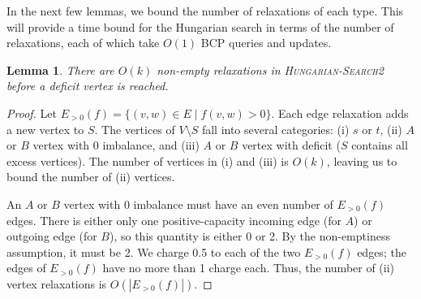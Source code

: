 \documentclass[11pt]{article}
\def\eps{\varepsilon}
\theoremstyle{plain}
\newtheorem{lemma}{Lemma}
\begin{document}








In the next few lemmas, we bound the number of relaxations of each type.
This will provide a time bound for the Hungarian search in terms of the
number of relaxations, each of which take $O(1)$ BCP queries and updates.

\begin{lemma}
\label{lemma:goldberg_hs_length1}
There are $O(k)$ non-empty relaxations in \textsc{Hungarian-Search2} before a
deficit vertex is reached.
\end{lemma}

\begin{proof}
Let $E_{>0}(f) = \{(v, w) \in E \mid f(v, w) > 0\}$.
Each edge relaxation adds a new vertex to $S$.
The vertices of $V \setminus S$ fall into several categories:
(i) $s$ or $t$, (ii) $A$ or $B$ vertex with 0 imbalance, and (iii) $A$ or $B$
vertex with deficit ($S$ contains all excess vertices).
The number of vertices in (i) and (iii) is $O(k)$, leaving us to bound the
number of (ii) vertices.

An $A$ or $B$ vertex with 0 imbalance must have an even number of $E_{>0}(f)$
edges.
There is either only one positive-capacity incoming edge (for $A$) or outgoing
edge (for $B$), so this quantity is either 0 or 2.
By the non-emptiness assumption, it must be 2.
We charge 0.5 to each of the two $E_{>0}(f)$ edges; the edges of $E_{>0}(f)$
have no more than 1 charge each.
Thus, the number of (ii) vertex relaxations is $O(|E_{>0}(f)|)$.
\end{proof}
\end{document}

